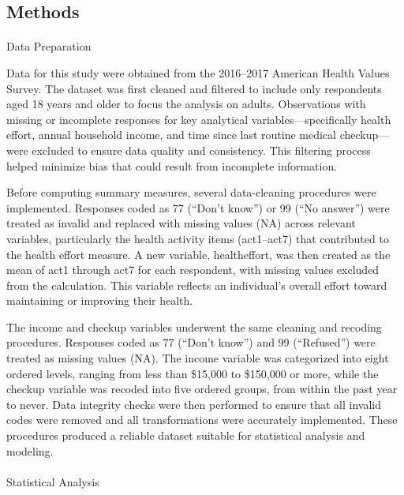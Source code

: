 \documentclass[
  letterpaper,
  DIV=11,
  numbers=noendperiod]{scrartcl}
\makeatletter
\let\oldparagraph\paragraph
\renewcommand{\paragraph}{
    \@ifstar
      \xxxParagraphStar
      \xxxParagraphNoStar
  }
\newcommand{\xxxParagraphStar}[1]{\oldparagraph*{#1}\mbox{}}
\newcommand{\xxxParagraphNoStar}[1]{\oldparagraph{#1}\mbox{}}
\makeatother
\begin{document}
\subsection{Methods}\label{methods}

\paragraph{Data Preparation}\label{sec-dataprep-methods}

Data for this study were obtained from the 2016--2017 American Health
Values Survey. The dataset was first cleaned and filtered to include
only respondents aged 18 years and older to focus the analysis on
adults. Observations with missing or incomplete responses for key
analytical variables---specifically health effort, annual household
income, and time since last routine medical checkup---were excluded to
ensure data quality and consistency. This filtering process helped
minimize bias that could result from incomplete information.

Before computing summary measures, several data-cleaning procedures were
implemented. Responses coded as 77 (``Don't know'') or 99 (``No
answer'') were treated as invalid and replaced with missing values (NA)
across relevant variables, particularly the health activity items
(act1--act7) that contributed to the health effort measure. A new
variable, healtheffort, was then created as the mean of act1 through
act7 for each respondent, with missing values excluded from the
calculation. This variable reflects an individual's overall effort
toward maintaining or improving their health.

The income and checkup variables underwent the same cleaning and
recoding procedures. Responses coded as 77 (``Don't know'') and 99
(``Refused'') were treated as missing values (NA). The income variable
was categorized into eight ordered levels, ranging from less than
\$15,000 to \$150,000 or more, while the checkup variable was recoded
into five ordered groups, from within the past year to never. Data
integrity checks were then performed to ensure that all invalid codes
were removed and all transformations were accurately implemented. These
procedures produced a reliable dataset suitable for statistical analysis
and modeling.

\paragraph{Statistical Analysis}\label{sec-analysis-methods}
\end{document}
